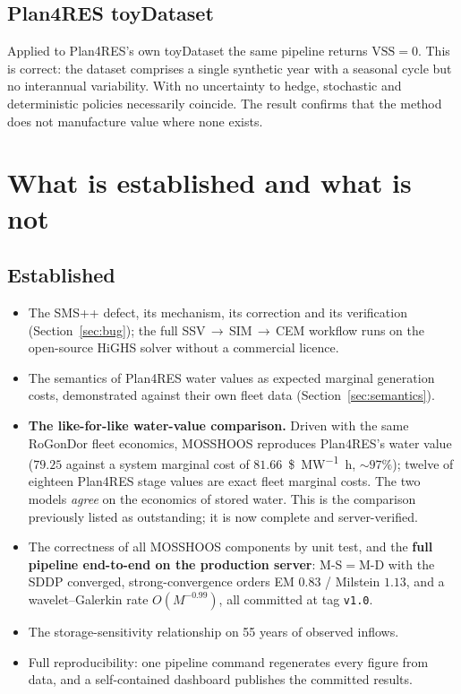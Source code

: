 \documentclass[12pt,a4paper]{article}
\begin{document}
\subsection{Plan4RES toyDataset}

Applied to Plan4RES's own toyDataset the same pipeline returns
$\mathrm{VSS} = 0$. This is correct: the dataset comprises a single synthetic
year with a seasonal cycle but no interannual variability. With no uncertainty to
hedge, stochastic and deterministic policies necessarily coincide. The result
confirms that the method does not manufacture value where none exists.

\section{What is established and what is not}

\subsection{Established}
\begin{itemize}[itemsep=2pt]
\item The SMS++ defect, its mechanism, its correction and its verification
(Section~\ref{sec:bug}); the full SSV\,$\rightarrow$\,SIM\,$\rightarrow$\,CEM
workflow runs on the open-source HiGHS solver without a commercial licence.
\item The semantics of Plan4RES water values as expected marginal generation
costs, demonstrated against their own fleet data (Section~\ref{sec:semantics}).
\item \textbf{The like-for-like water-value comparison.} Driven with the same
RoGonDor fleet economics, MOSSHOOS reproduces Plan4RES's water value
($79.25$ against a system marginal cost of $81.66$~\si{\$\per\mega\watt\hour},
$\sim\!97\%$); twelve of eighteen Plan4RES stage values are exact fleet marginal
costs. The two models \emph{agree} on the economics of stored water. This is the
comparison previously listed as outstanding; it is now complete and
server-verified.
\item The correctness of all MOSSHOOS components by unit test, and the
\textbf{full pipeline end-to-end on the production server}: M-S$=$M-D with the
SDDP converged, strong-convergence orders EM $0.83$ / Milstein $1.13$, and a
wavelet--Galerkin rate $O(M^{-0.99})$, all committed at tag \texttt{v1.0}.
\item The storage-sensitivity relationship on 55 years of observed inflows.
\item Full reproducibility: one pipeline command regenerates every figure from
data, and a self-contained dashboard publishes the committed results.
\end{itemize}
\end{document}
